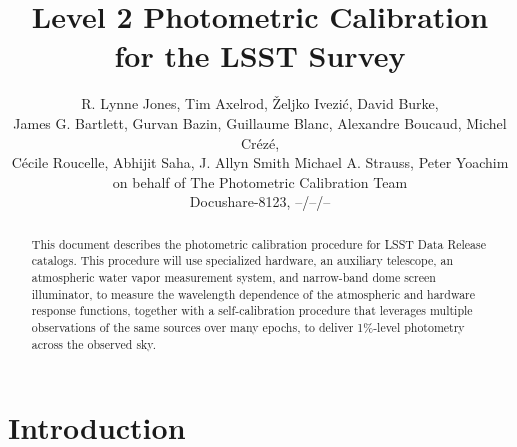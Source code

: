 \documentclass[12pt,preprint]{aastex}
\begin{document}
\title{Level 2 Photometric Calibration for the LSST Survey}

\author{
R. Lynne Jones, Tim Axelrod,
{\v Z}eljko Ivezi{\'c},   David Burke, \\
James G. Bartlett, 
Gurvan Bazin,
Guillaume Blanc,
Alexandre Boucaud, 
Michel Cr{\'e}z{\'e}, \\ 
C{\'e}cile Roucelle, 
Abhijit Saha, 
J. Allyn Smith
Michael A. Strauss,
Peter Yoachim \\
on behalf of 
The Photometric Calibration Team \\ 
Docushare-8123, --/--/-- \\
}



\begin{abstract}
This document describes the photometric calibration procedure for LSST
Data Release catalogs. This procedure will use specialized hardware, 
an auxiliary telescope, an atmospheric water vapor measurement system, and narrow-band dome screen illuminator, to
measure the wavelength dependence of the atmospheric and hardware
response functions, together with a self-calibration procedure that
leverages multiple observations of the same sources over many epochs,
to deliver 1\%-level photometry across the observed sky.
\end{abstract}

\tableofcontents

\section{Introduction}
\end{document}

